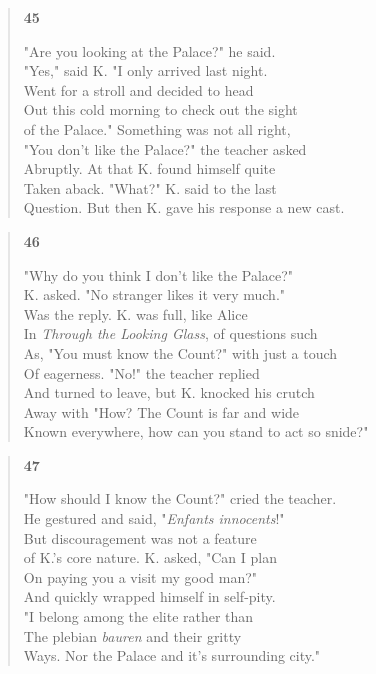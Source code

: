 \documentclass{article}
\begin{document}
\begin{verse}
  \begin{center}
    \textbf{45} \\
  \end{center}
  "Are you looking at the Palace?" he said. \\
  "Yes," said K. "I only arrived last night. \\
  Went for a stroll and decided to head \\
  Out this cold morning to check out the sight \\
  of the Palace." Something was not all right, \\
  "You don't like the Palace?" the teacher asked \\
  Abruptly. At that K. found himself quite \\
  Taken aback. "What?" K. said to the last \\
  Question. But then K. gave his response a new cast.
\end{verse}
\begin{verse}
  \begin{center}
    \textbf{46} \\
  \end{center}
"Why do you think I don't like the Palace?" \\
K. asked. "No stranger likes it very much." \\
Was the reply. K. was full, like Alice \\
In \textit{Through the Looking Glass}, of questions such \\
As, "You must know the Count?" with just a touch \\
Of eagerness. "No!" the teacher replied \\
And turned to leave, but K. knocked his crutch \\
Away with "How? The Count is far and wide \\
Known everywhere, how can you stand to act so snide?"
\end{verse}
\begin{verse}
  \begin{center}
    \textbf{47} \\
  \end{center}
  "How should I know the Count?" cried the teacher. \\
  He gestured and said, "\textit{Enfants innocents}!" \\
  But discouragement was not a feature \\
  of K.'s core nature. K. asked, "Can I plan \\
  On paying you a visit my good man?" \\
  And quickly wrapped himself in self-pity. \\
  "I belong among the elite rather than \\
  The plebian \textit{bauren} and their gritty \\
  Ways. Nor the Palace and it's surrounding city."
\end{verse}
\end{document}
